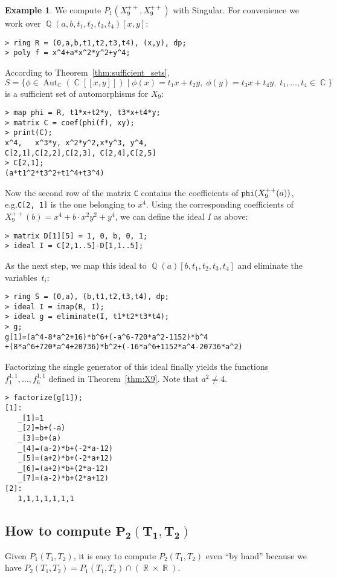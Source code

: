 \documentclass[noend]{amsproc}
\theoremstyle{definition}
\newtheorem{example}[theorem]{Example}
\DeclareMathOperator{\Q}{\mathbb{Q}}
\DeclareMathOperator{\R}{\mathbb{R}}
\DeclareMathOperator{\C}{\mathbb{C}}
\DeclareMathOperator{\Aut}{Aut}
\begin{document}
\begin{example}\label{ex:P1}
We compute $P_1(X_9^{++}, X_9^{++})$ with Singular. For convenience we work
over $\Q(a,b,t_1,t_2,t_3,t_4)[x,y]$:
\begin{verbatim}
> ring R = (0,a,b,t1,t2,t3,t4), (x,y), dp;
> poly f = x^4+a*x^2*y^2+y^4;
\end{verbatim}
According to Theorem~\ref{thm:sufficient_sets},
\[
S = \{ \phi \in \Aut_{\C}(\C[[x,y]])
\mid \phi(x) = t_1 x + t_2 y,\; \phi(y) = t_3 x + t_4 y,\;
t_1, \ldots, t_4 \in \C \}
\]
is a sufficient set of automorphisms for $X_9$:
\begin{verbatim}
> map phi = R, t1*x+t2*y, t3*x+t4*y;
> matrix C = coef(phi(f), xy);
> print(C);
x^4,   x^3*y, x^2*y^2,x*y^3, y^4,  
C[2,1],C[2,2],C[2,3], C[2,4],C[2,5]
> C[2,1];
(a*t1^2*t3^2+t1^4+t3^4)
\end{verbatim}
Now the second row of the matrix \verb+C+ contains the coefficients of
$\verb+phi+(X_9^{++}(a))$, e.g.\@ \verb+C[2, 1]+ is the one belonging to $x^4$.
Using the corresponding coefficients of
$X_9^{++}(b) = x^4 + b \cdot x^2 y^2 + y^4$, we can define the ideal $I$ as
above:
\begin{verbatim}
> matrix D[1][5] = 1, 0, b, 0, 1;
> ideal I = C[2,1..5]-D[1,1..5];
\end{verbatim}
As the next step, we map this ideal to $\Q(a)[b,t_1,t_2,t_3,t_4]$ and eliminate
the variables~$t_i$:
\begin{verbatim}
> ring S = (0,a), (b,t1,t2,t3,t4), dp;
> ideal I = imap(R, I);
> ideal g = eliminate(I, t1*t2*t3*t4);
> g;
g[1]=(a^4-8*a^2+16)*b^6+(-a^6-720*a^2-1152)*b^4
+(8*a^6+720*a^4+20736)*b^2+(-16*a^6+1152*a^4-20736*a^2)
\end{verbatim}
Factorizing the single generator of this ideal finally yields the functions
$f_1^{1,1}, \ldots, f_6^{1,1}$ defined in Theorem~\ref{thm:X9}. Note that
$a^2 \neq 4$.
\begin{verbatim}
> factorize(g[1]);
[1]:
   _[1]=1
   _[2]=b+(-a)
   _[3]=b+(a)
   _[4]=(a-2)*b+(-2*a-12)
   _[5]=(a+2)*b+(-2*a+12)
   _[6]=(a+2)*b+(2*a-12)
   _[7]=(a-2)*b+(2*a+12)
[2]:
   1,1,1,1,1,1,1
\end{verbatim}
\end{example}


\subsection{How to compute $\boldsymbol{P_2(T_1, T_2)}$}

Given $P_1(T_1, T_2)$, it is easy to compute $P_2(T_1, T_2)$ even ``by hand''
because we have $P_2(T_1, T_2) = P_1(T_1, T_2) \cap (\R \times \R)$.
\end{document}

